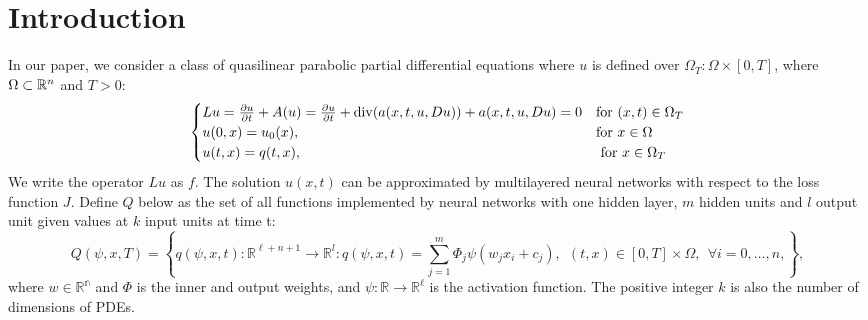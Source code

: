 \documentclass{article}
\begin{document}
	\tableofcontents
	\section{Introduction}

	In our paper, we consider a class of quasilinear parabolic partial differential equations where $u$ is defined over $\Omega_T:\Omega\times [0,T]$, where $\Omega\subset\Bbb R^n$ and $T>0$:
	\begin{equation}
	\begin{cases}
 Lu=\frac{\partial u}{\partial t} +A(u) =\frac{\partial u}{\partial t}+{\rm div}(a(x,t,u,Du))+a(x,t,u,Du)=0 & \text{for $(x,t) \in \Omega_{T}$}\\
u(0,x) = u_{0}(x), & \text{for $x \in \Omega$} \\
u(t,x) = q(t,x), & \text{ for $x \in \Omega_{T}$} \\
	\end{cases}
	\label{eq:cauchy}
	\end{equation}
	We write the operator $Lu$ as $f$. The solution $u(x,t)$ can be approximated by multilayered neural networks with respect to the loss function $J$.
Define $Q$ below as the set of all functions implemented by neural networks with one hidden layer, $m$ hidden units and $\textit{l}$ output unit given values at $k$ input units at time t:
	\begin{equation}
	Q(\psi,x,T)=\left \lbrace q(\psi,x,t): \mathbb{R}^{\ell+n+1} \rightarrow \mathbb{R}^{\textit{l}}:
q(\psi,x,t) = \sum_{j=1}^{m}\Phi_{j}\psi(w_{j}x_{i} + c_j ),\  \ (t,x) \in [0,T]\times \Omega, \ \ \forall i = 0, \dots, n ,  \right\rbrace,
	\label{eq:nn}
	\end{equation}
	where $w\in\mathbb{R^n}$ and $\Phi$ is the inner and output weights,
and $\psi:\mathbb{R}\to\mathbb{R^\ell}$ is the activation function.
The positive integer $k$ is also the number of dimensions of PDEs.
\end{document}
